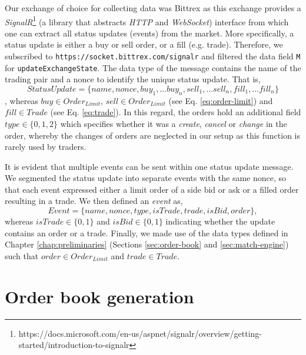 Our exchange of choice for collecting data was Bittrex as this exchange provides a \textit{SignalR}\footnote{https://docs.microsoft.com/en-us/aspnet/signalr/overview/getting-started/introduction-to-signalr} (a library that abstracts \textit{HTTP} and \textit{WebSocket}) interface from which one can extract all status updates (events) from the market.
More specifically, a status update is either a buy or sell order, or a fill (e.g. trade).
Therefore, we subscribed to \texttt{https://socket.bittrex.com/signalr} and filtered the data field \texttt{M} for \texttt{updateExchangeState}.
The data type of the message contains the name of the trading pair and a nonce to identify the unique status update.
That is,
\begin{equation}
    StatusUpdate = \{name, nonce, buy_1,...buy_n, sell_1,...sell_n, fill_1,...fill_n\}
\end{equation}
, whereas $buy \in Order_{Limit}$, $sell \in Order_{Limit}$ (see Eq. \ref{eq:order-limit}) and $fill \in Trade$ (see Eq. \ref{eq:trade}).
In this regard, the orders hold an additional field $type \in \{0,1,2\}$ which specifies whether it was a \textit{create}, \textit{cancel} or \textit{change} in the order, whereby the changes of orders are neglected in our setup as this function is rarely used by traders.

It is evident that multiple events can be sent within one status update message. 
We segmented the status update into separate events with the same nonce, so that each event expressed either a limit order of a side bid or ask or a filled order resulting in a trade.
We then defined an \textit{event} as,
\begin{equation}\label{eq:event-update}
    Event = \{name, nonce, type, isTrade, trade, isBid, order\},
\end{equation}
whereas $isTrade \in \{0,1\}$ and $isBid \in \{0,1\}$ indicating whether the update contains an order or a trade. 
Finally, we made use of the data types defined in Chapter \ref{chap:preliminaries} (Sections \ref{sec:order-book} and \ref{sec:match-engine}) such that $order \in Order_{Limit}$ and $trade \in Trade$.

\section{Order book generation}
\label{sec:data-generation}

